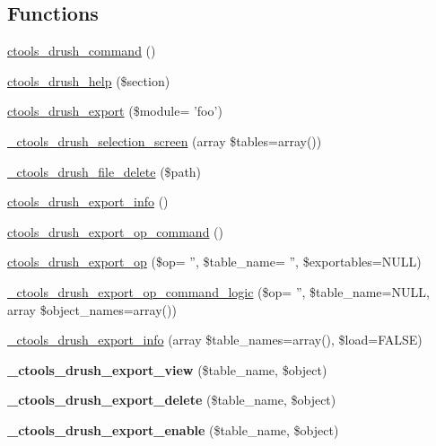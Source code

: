 \subsection*{Functions}
\begin{DoxyCompactItemize}
\item 
\hyperlink{ctools_8drush_8inc_afd3a39513891dc7bcc3870d2acaa1b6a}{ctools\_\-drush\_\-command} ()
\item 
\hyperlink{ctools_8drush_8inc_a447a62ee2e68fc6c9d52398963fe09be}{ctools\_\-drush\_\-help} (\$section)
\item 
\hyperlink{ctools_8drush_8inc_a6a3eb8522b6855b79a3d09a362cbb2b1}{ctools\_\-drush\_\-export} (\$module= 'foo')
\item 
\hyperlink{ctools_8drush_8inc_a1ec2db7bb55a2ec3bc9cf43c744ac5e6}{\_\-ctools\_\-drush\_\-selection\_\-screen} (array \$tables=array())
\item 
\hyperlink{ctools_8drush_8inc_acc9c99f00479096071cb2516350148af}{\_\-ctools\_\-drush\_\-file\_\-delete} (\$path)
\item 
\hyperlink{ctools_8drush_8inc_adb91b1445c9116664fbe5f29e815e119}{ctools\_\-drush\_\-export\_\-info} ()
\item 
\hyperlink{ctools_8drush_8inc_a88b3f720a5f716558866a2e26fe24dc9}{ctools\_\-drush\_\-export\_\-op\_\-command} ()
\item 
\hyperlink{ctools_8drush_8inc_aaa52db837a2d9485e2197941caa74f06}{ctools\_\-drush\_\-export\_\-op} (\$op= '', \$table\_\-name= '', \$exportables=NULL)
\item 
\hyperlink{ctools_8drush_8inc_af5212f1cdc2b708efbd93619e2697aab}{\_\-ctools\_\-drush\_\-export\_\-op\_\-command\_\-logic} (\$op= '', \$table\_\-name=NULL, array \$object\_\-names=array())
\item 
\hyperlink{ctools_8drush_8inc_aac7483ee1798cd2ff0d56f0237258dde}{\_\-ctools\_\-drush\_\-export\_\-info} (array \$table\_\-names=array(), \$load=FALSE)
\item 
\hypertarget{ctools_8drush_8inc_abbe2bc5dbc6ce04eb0c2c4b9a6ea7fef}{
{\bfseries \_\-ctools\_\-drush\_\-export\_\-view} (\$table\_\-name, \$object)}
\label{ctools_8drush_8inc_abbe2bc5dbc6ce04eb0c2c4b9a6ea7fef}

\item 
\hypertarget{ctools_8drush_8inc_a502925f0b2ca376754835ca708a02e53}{
{\bfseries \_\-ctools\_\-drush\_\-export\_\-delete} (\$table\_\-name, \$object)}
\label{ctools_8drush_8inc_a502925f0b2ca376754835ca708a02e53}

\item 
\hypertarget{ctools_8drush_8inc_a9f55829b11c4a177a37db5c2dfc87a26}{
{\bfseries \_\-ctools\_\-drush\_\-export\_\-enable} (\$table\_\-name, \$object)}
\label{ctools_8drush_8inc_a9f55829b11c4a177a37db5c2dfc87a26}


\end{DoxyCompactItemize}
